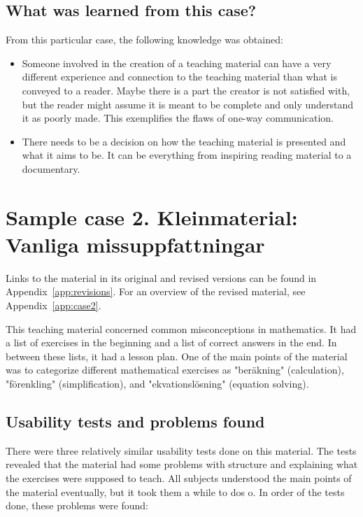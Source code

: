 \subsection{What was learned from this case?}
From this particular case, the following knowledge was obtained:
\begin{itemize}
    \item Someone involved in the creation of a teaching material can have a very different experience and connection to the teaching material than what is conveyed to a reader. Maybe there is a part the creator is not satisfied with, but the reader might assume it is meant to be complete and only understand it as poorly made. This exemplifies the flaws of one-way communication.
    \item There needs to be a decision on how the teaching material is presented and what it aims to be. It can be everything from inspiring reading material to a documentary.
\end{itemize}

\section{Sample case 2. Kleinmaterial: Vanliga missuppfattningar} \label{samplecase2}
Links to the material in its original and revised versions can be found in Appendix~\ref{app:revisions}. For an overview of the revised material, see Appendix~\ref{app:case2}. 

This teaching material concerned common misconceptions in mathematics. It had a list of exercises in the beginning and a list of correct answers in the end. In between these lists, it had a lesson plan. One of the main points of the material was to categorize different mathematical exercises as "beräkning" (calculation), "förenkling" (simplification), and "ekvationslösning" (equation solving).
\vspace{-0.5cm}


\subsection{Usability tests and problems found}
\vspace{-0.5cm}
There were three relatively similar usability tests done on this material. The tests revealed that the material had some problems with structure and explaining what the exercises were supposed to teach. All subjects understood the main points of the material eventually, but it took them a while to dos o. In order of the tests done, these problems were found:


